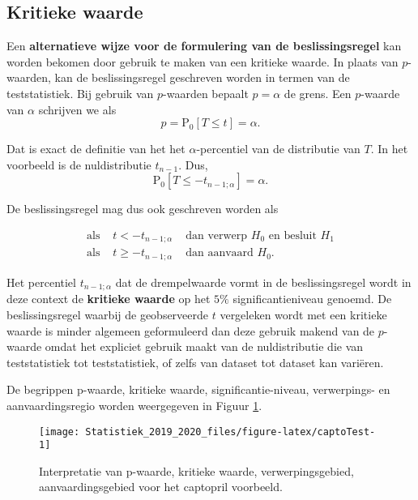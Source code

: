 \documentclass[12pt,dutch,coursenotes]{book}
\theoremstyle{definition}
\theoremstyle{definition}
\theoremstyle{definition}
\theoremstyle{remark}
\begin{document}
\subsection{Kritieke waarde}\label{kritieke-waarde}

Een \textbf{alternatieve wijze voor de formulering van de
beslissingsregel} kan worden bekomen door gebruik te maken van een
kritieke waarde. In plaats van \(p\)-waarden, kan de beslissingsregel
geschreven worden in termen van de teststatistiek. Bij gebruik van
\(p\)-waarden bepaalt \(p=\alpha\) de grens. Een \(p\)-waarde van
\(\alpha\) schrijven we als
\[p=\text{P}_0 \left[ T \leq t \right]=\alpha.\]

Dat is exact de definitie van het het \(\alpha\)-percentiel van de
distributie van \(T\). In het voorbeeld is de nuldistributie
\(t_{n-1}\).
Dus,\[\text{P}_0\left[T\leq -t_{n-1;\alpha}\right]=\alpha.\]

De beslissingsregel mag dus ook geschreven worden als

\begin{eqnarray*} 
\text{als } & t< -t_{n-1;\alpha} & \text{ dan verwerp }H_0\text{ en besluit }H_1 \\
  \text{als } & t\geq -t_{n-1;\alpha} & \text{ dan aanvaard }H_0.
\end{eqnarray*}

Het percentiel \(t_{n-1;\alpha}\) dat de drempelwaarde vormt in de
beslissingsregel wordt in deze context de \textbf{kritieke waarde} op
het \(5\%\) significantieniveau genoemd. De beslissingsregel waarbij de
geobserveerde \(t\) vergeleken wordt met een kritieke waarde is minder
algemeen geformuleerd dan deze gebruik makend van de \(p\)-waarde omdat
het expliciet gebruik maakt van de nuldistributie die van teststatistiek
tot teststatistiek, of zelfs van dataset tot dataset kan variëren.

De begrippen p-waarde, kritieke waarde, significantie-niveau,
verwerpings- en aanvaardingsregio worden weergegeven in Figuur
\ref{fig:captoTest}.

\begin{figure}

{\centering \texttt{[image: Statistiek\_2019\_2020\_files/figure-latex/captoTest-1]} 

}

\caption{Interpretatie van p-waarde, kritieke waarde, verwerpingsgebied, aanvaardingsgebied voor het captopril voorbeeld.}\label{fig:captoTest}
\end{figure}
\end{document}
